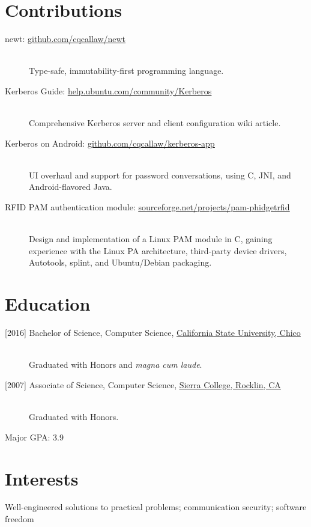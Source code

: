 \documentclass{article}
\begin{document}
	\section*{Contributions}
	\begin{description}
		\item[newt: \href{https://github.com/cqcallaw/newt}{\uline{github.com/cqcallaw/newt}}] \hfill \\
		Type-safe, immutability-first programming language.
		\item[Kerberos Guide: \href{https://help.ubuntu.com/community/Kerberos}{\uline{help.ubuntu.com/community/Kerberos}}] \hfill \\
		Comprehensive Kerberos server and client configuration wiki article.
		\item[Kerberos on Android: \href{https://github.com/cqcallaw/kerberos-app/}{\uline{github.com/cqcallaw/kerberos-app}}] \hfill \\
		UI overhaul and support for password conversations, using C, JNI, and Android-flavored Java.
		\item[RFID PAM authentication module: \href{http://sourceforge.net/projects/pam-phidgetrfid/}{\uline{sourceforge.net/projects/pam-phidgetrfid}}] \hfill \\
		Design and implementation of a Linux PAM module in C, gaining experience with the Linux PA architecture, third-party device drivers, Autotools, splint, and Ubuntu/Debian packaging.
	\end{description}

	\section*{Education}
	\begin{description}
		\item[{[}2016{]} Bachelor of Science, Computer Science, \href{http://www.csuchico.edu/}{\uline{California State University, Chico}}] \hfill \\
		Graduated with Honors and {\em magna cum laude}.
		\item[{[}2007{]} Associate of Science, Computer Science, \href{http://www.sierracollege.edu/}{\uline{Sierra College, Rocklin, CA}}] \hfill \\
		Graduated with Honors.
	\end{description}
	Major GPA: 3.9

	\section*{Interests}
	Well-engineered solutions to practical problems; communication security; software freedom
\end{document}
